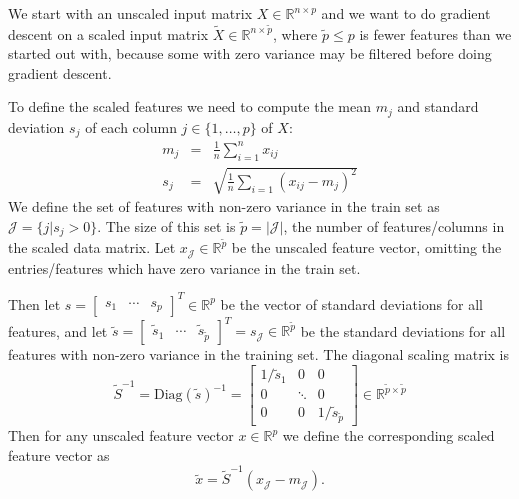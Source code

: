 \documentclass{article}
\begin{document}
We start with an unscaled input matrix $X\in\mathbb R^{n \times p}$
and we want to do gradient descent on a scaled input matrix
$\tilde X\in\mathbb R^{n\times \tilde p}$, where $\tilde p\leq p$ is
fewer features than we started out with, because some with zero
variance may be filtered before doing gradient descent.

To define the scaled features we need to compute the mean $m_j$ and
standard deviation $s_j$ of each column $j\in\{1,\dots, p\}$ of $X$:
\begin{eqnarray*}
  m_j &=& \frac 1 n \sum_{i=1}^n x_{ij}\\
  s_j &=& \sqrt{\frac 1 n \sum_{i=1} (x_{ij} - m_j)^2}
\end{eqnarray*}
We define the set of features with non-zero variance in the train set as
$\mathcal J = \{j|s_j>0\}$. The size of this set is
$\tilde p = |\mathcal J|$, the number of features/columns in the
scaled data matrix. Let $x_{\mathcal J}\in\mathbb R^{\tilde p}$ be the
unscaled feature vector, omitting the entries/features which have zero
variance in the train set.

Then let $s =\left[
\begin{array}{ccc}
  s_1&\cdots & s_p
\end{array}
\right]^T\in\mathbb R^p$ be the vector of standard deviations for all
features, and let $\tilde s =\left[
\begin{array}{ccc}
  \tilde s_1&\cdots & \tilde s_{\tilde p}
\end{array}
\right]^T = s_{\mathcal J}\in\mathbb R^{\tilde p}$ be the standard
deviations for all features with non-zero variance in the training
set. The diagonal scaling matrix is
\begin{equation}
  \tilde S^{-1} = \text{Diag}(\tilde s)^{-1}=\left[
    \begin{array}{ccc}
      1/\tilde s_1& 0&0\\
      0 & \ddots & 0\\
      0 & 0 & 1/\tilde s_{\tilde p}
    \end{array}
\right]\in\mathbb R^{\tilde p\times \tilde p}
\end{equation}
Then for any unscaled feature vector $x\in \mathbb R^p$ we define the
corresponding scaled feature vector as 
\begin{equation}
  \label{eq:scaled-feature}
  \tilde x = \tilde S^{-1} (x_{\mathcal J} - m_{\mathcal J}).
\end{equation}
\end{document}
